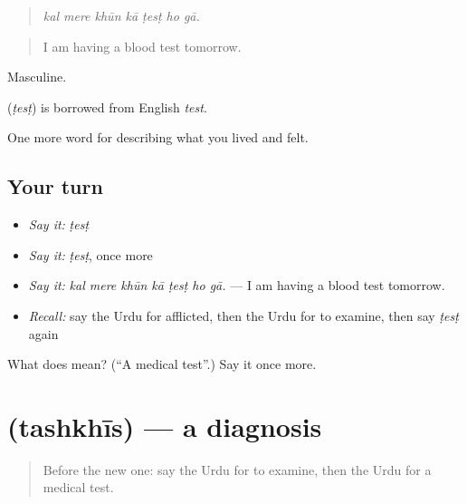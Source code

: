 \begin{quote}
      
\end{quote}

\begin{quote}
\emph{kal mere khūn kā ṭesṭ ho gā.}
\end{quote}

\begin{quote}
I am having a blood test tomorrow.
\end{quote}

Masculine.

\begin{cousinweb}
\textbf{} (\emph{ṭesṭ}) is borrowed from English \emph{test}.
\end{cousinweb}

\begin{grammarlens}[title={What you've built}]
One more word for describing what you lived and felt.
\end{grammarlens}

\subsection*{Your turn}
\begin{itemize}
\raggedright
  \item \emph{Say it:} \emph{ṭesṭ}
  \item \emph{Say it:} \emph{ṭesṭ}, once more
  \item \emph{Say it:} \emph{kal mere khūn kā ṭesṭ ho gā.} — I am having a blood test tomorrow.
  \item \emph{Recall:} say the Urdu for afflicted, then the Urdu for to examine, then say \emph{ṭesṭ} again
\end{itemize}

\begin{tcolorbox}[breakable,colback=teal!4,colframe=teal!35!black,title={Before you move on}]
What does  mean? (\textquotedblleft{}A medical test\textquotedblright{}.) Say it once more.
\end{tcolorbox}
\section[\texorpdfstring{\ur{تشخیص} (tashkhīs)}{تشخیص (tashkhīs)}]{ (tashkhīs) — a diagnosis}

\label{lesson:UR-C476-tashkhis}



\begin{quote}
Before the new one: say the Urdu for to examine, then the Urdu for a medical test.
\end{quote}

